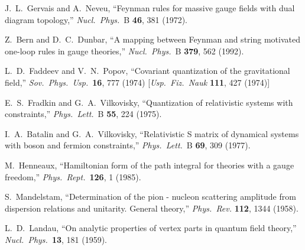 \documentclass[12pt]{livrev}
\begin{document}
\begin{thebibliography}{99}
J.~L.~Gervais and A.~Neveu,
``Feynman rules for massive gauge fields with dual diagram topology,''
{\it Nucl.\ Phys.}\ B {\bf 46}, 381 (1972).

Z.~Bern and D.~C.~Dunbar,
``A mapping between Feynman and string motivated one-loop rules in 
gauge theories,''
{\it Nucl.\ Phys.}\ B {\bf 379}, 562 (1992).

L.~D.~Faddeev and V.~N.~Popov,
``Covariant quantization of the gravitational field,''
{\it Sov.\ Phys.\ Usp.}\  {\bf 16}, 777 (1974)
[{\it Usp.\ Fiz.\ Nauk} {\bf 111}, 427 (1974)]

E.~S.~Fradkin and G.~A.~Vilkovisky,
``Quantization of relativistic systems with constraints,''
{\it Phys.\ Lett.}\ B {\bf 55}, 224 (1975).

I.~A.~Batalin and G.~A.~Vilkovisky,
``Relativistic S matrix of dynamical systems with boson and fermion 
constraints,''
{\it Phys.\ Lett.}\ B {\bf 69}, 309 (1977).

M.~Henneaux,
``Hamiltonian form of the path integral for theories with a gauge freedom,''
{\it Phys.\ Rept.}\  {\bf 126}, 1 (1985).

S.~Mandelstam,
``Determination of the pion - nucleon scattering amplitude from dispersion 
relations and unitarity. General theory,''
{\it Phys.\ Rev.}  {\bf 112}, 1344 (1958).

L.~D.~Landau,
``On analytic properties of vertex parts in quantum field theory,''
{\it Nucl.\ Phys.}\  {\bf 13}, 181 (1959).


\end{thebibliography}
\end{document}
